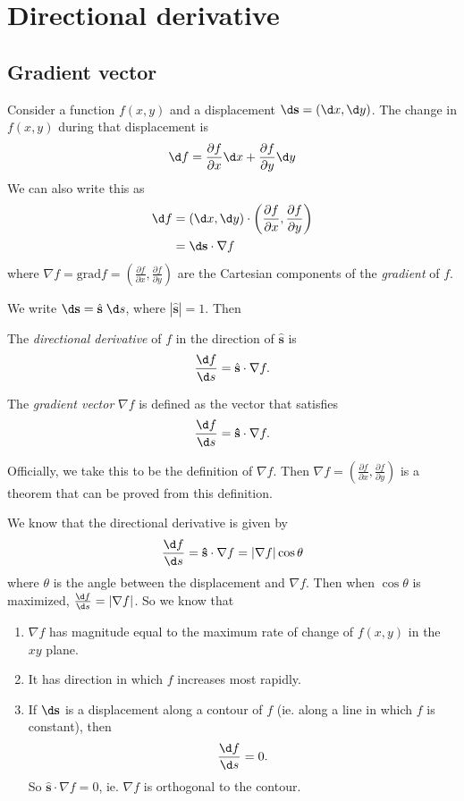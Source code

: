 \documentclass[a4paper]{article}
\begin{document}
\section{Directional derivative}
\label{sec:directional-derivative}
\subsection{Gradient vector}
Consider a function $f(x, y)$ and a displacement $\d\mathbf{s} = (\d x, \d y)$. The change in $f(x, y)$ during that displacement is
\[
  \d f = \frac{\partial f}{\partial x}\d x + \frac{\partial f}{\partial y}\d y
\]
We can also write this as
\begin{align*}
  \d f &= (\d x, \d y)\cdot \left(\frac{\partial f}{\partial x}, \frac{\partial f}{\partial y}\right)\\
  &= \d\mathbf{s}\cdot \nabla f
\end{align*}
where $\nabla f = \mathrm{grad}f = \left(\frac{\partial f}{\partial x}, \frac{\partial f}{\partial y}\right)$ are the Cartesian components of the \emph{gradient} of $f$.

We write $\d\mathbf{s} = \hat{\mathbf{s}}\;\d s$, where $|\hat{\mathbf{s}}| = 1$. Then
\begin{defi}
  The \emph{directional derivative} of $f$ in the direction of $\hat{\mathbf{s}}$ is
  \[
    \frac{\d f}{\d s} = \hat{\mathbf{s}}\cdot \nabla f.
  \]
\end{defi}

\begin{defi}
  The \emph{gradient vector} $\nabla f$ is defined as the vector that satisfies
  \[
    \frac{\d f}{\d s} = \mathbf{\hat{s}}\cdot \nabla f.
  \]
\end{defi}
Officially, we take this to be the definition of $\nabla f$. Then $\nabla f = \left(\frac{\partial f}{\partial x}, \frac{\partial f}{\partial y}\right)$ is a theorem that can be proved from this definition.

We know that the directional derivative is given by
\[
  \frac{\d f}{\d s} = \mathbf{\hat{s}}\cdot \nabla f = |\nabla f| \cos \theta
\]
where $\theta$ is the angle between the displacement and $\nabla f$. Then when $\cos\theta$ is maximized, $\frac{\d f}{\d s} = |\nabla f|$. So we know that
\begin{enumerate}
  \item $\nabla f$ has magnitude equal to the maximum rate of change of $f(x, y)$ in the $xy$ plane.
  \item It has direction in which $f$ increases most rapidly.
  \item If $\d\mathbf{s}$ is a displacement along a contour of $f$ (ie. along a line in which $f$ is constant), then
    \[
      \frac{\d f}{\d s} = 0.
    \]
    So $\mathbf{\hat{s}}\cdot \nabla f = 0$, ie. $\nabla f$ is orthogonal to the contour.
\end{enumerate}
\end{document}

